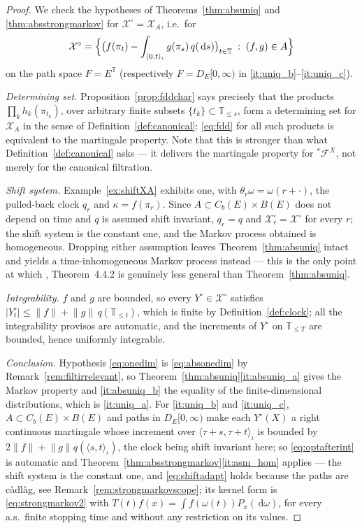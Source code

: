\documentclass[11pt,a4paper]{article}
\theoremstyle{plain}
\theoremstyle{definition}
\theoremstyle{remark}
\newcommand{\T}{\mathbb{T}}                     %
\newcommand{\Bdd}{B}                           %
\newcommand{\Cb}{C_b}                          %
\newcommand{\DE}{D_E[0,\infty)}
\newcommand{\Filt}{\mathcal{F}}
\newcommand{\XX}{\mathcal{X}}                  %
\newcommand{\dif}{\,\mathrm{d}}
\newcommand{\EK}{\cite{EK86}}
\begin{document}
\begin{proof}
  We check the hypotheses of Theorems~\ref{thm:absuniq} and
  \ref{thm:absstrongmarkov} for $\XX^\circ = \XX_A$, i.e.\ for
  \[
    \XX^\circ = \Bigl\{ \bigl( f(\pi_t)
      - \int_{\langle 0,t \rangle_\iota} g(\pi_s)\, q(\dif s)
      \bigr)_{t \in \T} \;:\; (f,g) \in A \Bigr\}
  \]
  on the path space $F = E^{\T}$ (respectively $F = \DE$ in
  \ref{it:uniq_b}--\ref{it:uniq_c}).

  \emph{Determining set.}  Proposition~\ref{prop:fddchar} says precisely that the
  products $\prod_{k} h_k(\pi_{t_k})$, over arbitrary finite subsets
  $\{t_k\} \subset \T_{\leq s}$, form a determining set for $\XX_A$ in the sense
  of Definition~\ref{def:canonical}: \eqref{eq:fdd} for all such products is
  equivalent to the martingale property.  Note that this is stronger than what
  Definition~\ref{def:canonical} asks --- it delivers the martingale property for
  ${}^{*}\Filt^X$, not merely for the canonical filtration.

  \emph{Shift system.}  Example~\ref{ex:shiftXA} exhibits one, with
  $\theta_r\omega = \omega(r+\cdot)$, the pulled-back clock $q_r$ and
  $\kappa = f(\pi_r)$.  Since $A \subset \Cb(E) \times \Bdd(E)$ does not depend on
  time and $q$ is assumed shift invariant, $q_r = q$ and $\XX^\circ_r = \XX^\circ$
  for every $r$; the shift system is the constant one, and the Markov process
  obtained is homogeneous.  Dropping either assumption leaves
  Theorem~\ref{thm:absuniq} intact and yields a time-inhomogeneous Markov process
  instead --- this is the only point at which \EK, Theorem~4.4.2 is genuinely less
  general than Theorem~\ref{thm:absuniq}.

  \emph{Integrability.}  $f$ and $g$ are bounded, so every $Y^\circ \in \XX^\circ$
  satisfies
  $|Y^\circ_t| \leq \lVert f \rVert + \lVert g \rVert \, q(\T_{\leq t})$, which is
  finite by Definition~\ref{def:clock}; all the integrability provisos are
  automatic, and the increments of $Y^\circ$ on $\T_{\leq T}$ are bounded, hence
  uniformly integrable.

  \emph{Conclusion.}  Hypothesis \eqref{eq:onedim} is \eqref{eq:absonedim} by
  Remark~\ref{rem:filtirrelevant}, so
  Theorem~\ref{thm:absuniq}\ref{it:absuniq_a} gives the Markov property and
  \ref{it:absuniq_b} the equality of the finite-dimensional distributions, which
  is \ref{it:uniq_a}.  For \ref{it:uniq_b} and \ref{it:uniq_c}, $A \subset
  \Cb(E)\times\Bdd(E)$ and paths in $\DE$ make each $Y^\circ(X)$ a right
  continuous martingale whose increment over
  $\langle \tau+s,\tau+t \rangle_\iota$ is bounded by
  $2\lVert f\rVert + \lVert g\rVert q(\langle s,t\rangle_\iota)$, the clock
  being shift invariant here; so \eqref{eq:optafterint} is automatic and
  Theorem~\ref{thm:absstrongmarkov}\ref{it:asm_hom} applies --- the shift
  system is the constant one, and \eqref{eq:shiftadapt} holds because the paths
  are c\`adl\`ag, see Remark~\ref{rem:strongmarkovscope}; its kernel form is
  \eqref{eq:strongmarkov2} with $T(t)f(x) = \int f(\omega(t)) P_x(\dif\omega)$,
  for every a.s.\ finite stopping time and without any restriction on its
  values.
\end{proof}
\end{document}
